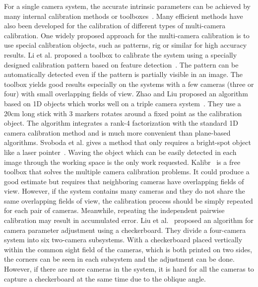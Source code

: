 For a single camera system, the accurate intrinsic parameters can be achieved by many internal calibration methods or toolboxes~\cite{zhang2000flexible,zhang2004camera}. Many efficient methods have also been developed for the calibration of different types of multi-camera calibration.
One widely proposed approach for the multi-camera calibration is to use special calibration objects, such as patterns, rig or similar for high accuracy results.
Li et al. proposed a toolbox to calibrate the system using a specially designed calibration pattern based on feature detection~\cite{Li2013A}. The pattern can be automatically detected even if the pattern is partially visible in an image. The toolbox yields good results especially on the systems with a few cameras (three or four) with small overlapping fields of view.
Zhao and Liu proposed an algorithm based on 1D objects which works well on a triple camera system~\cite{zhao2008practical}. They use a 20cm long stick with 3 markers rotates around a fixed point as the calibration object. The algorithm integrates a rank-4 factorization with the standard 1D camera calibration method and is much more convenient than plane-based algorithms.
Svoboda et al. gives a method that only requires a bright-spot object like a laser pointer~\cite{svoboda2005convenient}. Waving the object which can be easily detected in each image through the working space is the only work requested.
Kalibr~\cite{Maye2013Self} is a free toolbox that solves the multiple camera calibration problems.
It could produce a good estimate but requires that neighboring cameras have overlapping fields of view.
However, if the system contains many cameras and they do not share the same overlapping fields of view, the calibration process should be simply repeated for each pair of cameras. Meanwhile, repeating the independent pairwise calibration may result in accumulated error.
Liu et al.~\cite{Liu2015Algorithm} proposed an algorithm for camera parameter adjustment using a checkerboard. They divide a four-camera system into six two-camera subsystems. With a checkerboard placed vertically within the common sight field of the cameras, which is both printed on two sides, the corners can be seen in each subsystem and the adjustment can be done. However, if there are more cameras in the system, it is hard for all the cameras to capture a checkerboard at the same time due to the oblique angle.

